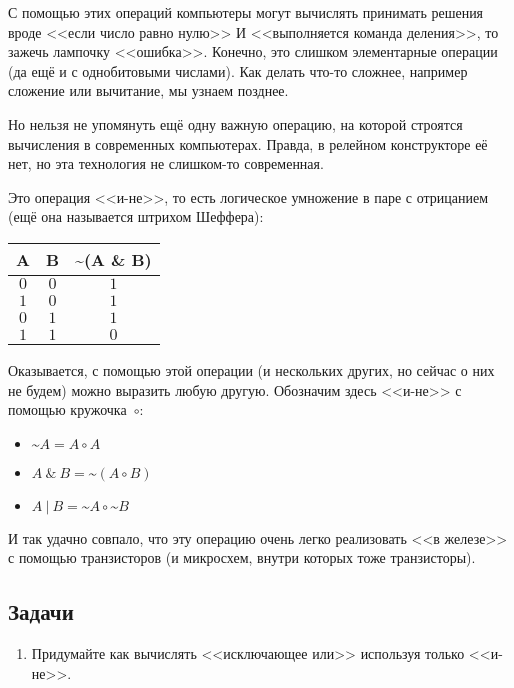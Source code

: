 С помощью этих операций компьютеры могут вычислять принимать решения вроде <<если число равно нулю>> И <<выполняется команда деления>>,
то зажечь лампочку <<ошибка>>.
Конечно, это слишком элементарные операции (да ещё и с однобитовыми числами).
Как делать что-то сложнее, например сложение или вычитание, мы узнаем позднее.

Но нельзя не упомянуть ещё одну важную операцию, на которой строятся вычисления в современных
компьютерах. Правда, в релейном конструкторе её нет, но эта технология не слишком-то современная.

Это операция <<и-не>>, то есть логическое умножение в паре с отрицанием (ещё она называется штрихом Шеффера):

\begin{center}
\begin{tabular}{|c|c|c|}
 \hline
 \textbf{A} & \textbf{B} & \textbf{\textasciitilde(A \& B)} \\ \hline
 $0$ & $0$ & $1$ \\ \hline
 $1$ & $0$ & $1$ \\ \hline
 $0$ & $1$ & $1$ \\ \hline
 $1$ & $1$ & $0$ \\ \hline
\end{tabular}
\end{center}

Оказывается, с помощью этой операции (и нескольких других, но сейчас о них не будем) можно выразить любую другую.
Обозначим здесь <<и-не>> с помощью кружочка~$\circ$:

\begin{itemize}
    \item $\mbox{\textasciitilde}A = A \circ A$
    \item $A\ \mbox{\&}\ B = \mbox{\textasciitilde}(A \circ B)$
    \item $A\ |\ B = \mbox{\textasciitilde}A \circ \mbox{\textasciitilde}B$
\end{itemize}

И так удачно совпало, что эту операцию очень легко реализовать <<в железе>>
с помощью транзисторов (и микросхем, внутри которых тоже транзисторы).

\subsection{Задачи}

\begin{enumerate}
    \item Придумайте как вычислять <<исключающее или>> используя только <<и-не>>.
\end{enumerate}

